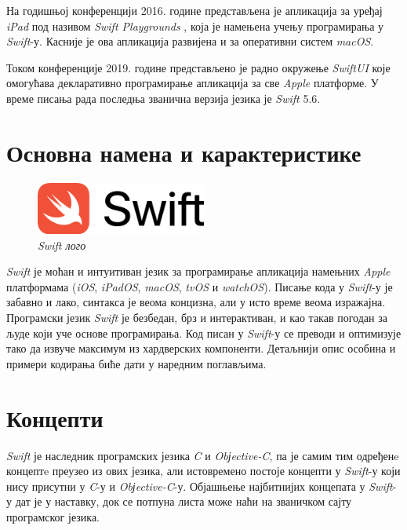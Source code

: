 \documentclass[12pt,oneside]{memoir}
\begin{document}
\indent На годишњој конференцији 2016. године представљена је апликација за уређај \textit{iPad} под називом \textit{Swift Playgrounds} \cite{Swift_Playground}, која је намењена учењу програмирања у \textit{Swift}-у. Касније је ова апликација развијена и за оперативни систем \textit{macOS}.

\indent Током конференције 2019. године представљено је радно окружење \textit{SwiftUI} \cite{Swift_SwiftUI} које омогућава декларативно програмирање апликација за све \textit{Apple} платформе. У време писања рада последња званична верзија језика је \textit{Swift} 5.6.

\section{Основна намена и карактеристике}

\begin{figure}[H]
\includegraphics[width=0.5\textwidth]{images/Swift_logo.png}
\centering
\caption{\textit{Swift лого}}
\label{slika:swift_logo}
\end{figure}

\indent \textit{Swift} је моћан и интуитиван језик за програмирање апликација намењних \textit{Apple} платформама (\textit{iOS}, \textit{iPadOS}, \textit{macOS}, \textit{tvOS} и  \textit{watchOS}). Писање кода у \textit{Swift}-у је забавно и лако, синтакса је веома концизна, али у исто време веома изражајна. Програмски језик \textit{Swift} је безбедан, брз и интерактиван, и као такав погодан за људе који уче основе програмирања. Код писан у \textit{Swift}-у се преводи и оптимизује тако да извуче максимум из хардверских компоненти. Детаљнији опис особина и примери кодирања биће дати у наредним поглављима. 

\section{Концепти}
\label{sec:Концепти}

\indent \textit{Swift} је наследник програмских језика \textit{C} и \textit{Obјective-C}, па је самим тим одређенe концептe преузео из ових језика, али истовремено постоје концепти у \textit{Swift}-у који нису присутни у \textit{C}-у и \textit{Obјective-C}-у. Објашњење најбитнијих концепата у \textit{Swift}-у дат је у наставку, док се потпуна листа може наћи на званичком сајту програмског језика. \cite{SwiftOfficialSite}
\end{document}
